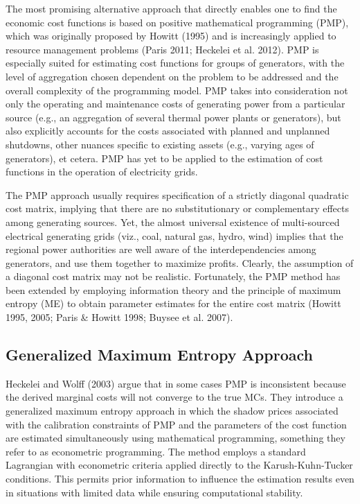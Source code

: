 \documentclass[10pt,letter]{article}
\begin{document}
The most promising alternative approach that directly enables one to
find the economic cost functions is based on positive mathematical
programming (PMP), which was originally proposed by Howitt (1995) and is
increasingly applied to resource management problems (Paris 2011;
Heckelei et al. 2012). PMP is especially suited for estimating cost
functions for groups of generators, with the level of aggregation chosen
dependent on the problem to be addressed and the overall complexity of
the programming model. PMP takes into consideration not only the
operating and maintenance costs of generating power from a particular
source (e.g., an aggregation of several thermal power plants or
generators), but also explicitly accounts for the costs associated with
planned and unplanned shutdowns, other nuances specific to existing
assets (e.g., varying ages of generators), et cetera. PMP has yet to be
applied to the estimation of cost functions in the operation of
electricity grids.

The PMP approach usually requires specification of a strictly diagonal
quadratic cost matrix, implying that there are no substitutionary or
complementary effects among generating sources. Yet, the almost
universal existence of multi-sourced electrical generating grids (viz.,
coal, natural gas, hydro, wind) implies that the regional power
authorities are well aware of the interdependencies among generators,
and use them together to maximize profits. Clearly, the assumption of a
diagonal cost matrix may not be realistic. Fortunately, the PMP method
has been extended by employing information theory and the principle of
maximum entropy (ME) to obtain parameter estimates for the entire cost
matrix (Howitt 1995, 2005; Paris \& Howitt 1998; Buysee et al. 2007).

\subsection{Generalized Maximum Entropy
Approach}\label{generalized-maximum-entropy-approach}

Heckelei and Wolff (2003) argue that in some cases PMP is inconsistent
because the derived marginal costs will not converge to the true MCs.
They introduce a generalized maximum entropy approach in which the
shadow prices associated with the calibration constraints of PMP and the
parameters of the cost function are estimated simultaneously using
mathematical programming, something they refer to as econometric
programming. The method employs a standard Lagrangian with econometric
criteria applied directly to the Karush-Kuhn-Tucker conditions. This
permits prior information to influence the estimation results even in
situations with limited data while ensuring computational stability.
\end{document}

